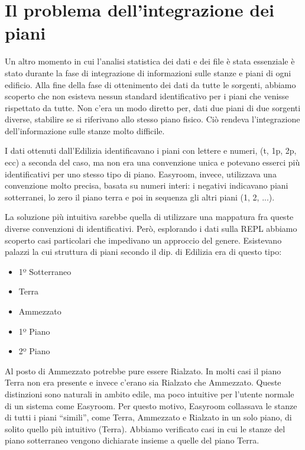 \documentclass[12pt]{report}
\begin{document}
\section{Il problema dell'integrazione dei piani}

Un altro momento in cui l'analisi statistica dei dati e dei file è
stata essenziale è stato durante la fase di integrazione di informazioni sulle
stanze e piani di ogni edificio. Alla fine della fase di ottenimento dei
dati da tutte le sorgenti, abbiamo scoperto che non esisteva nessun 
standard identificativo per i piani che venisse rispettato da tutte. 
Non c'era un modo diretto per, dati due piani di due sorgenti diverse,
stabilire se si riferivano allo stesso piano fisico. Ciò rendeva 
l'integrazione dell'informazione sulle stanze molto difficile.

I dati ottenuti dall'Edilizia identificavano i piani con lettere e numeri, 
(t, 1p, 2p, ecc) a seconda del caso, ma non era una convenzione unica 
e potevano esserci più identificativi per uno stesso tipo di piano. 
Easyroom, invece, utilizzava una convenzione molto precisa, 
basata su numeri interi: i negativi indicavano piani sotterranei,
lo zero il piano terra e poi in sequenza gli altri piani (1, 2, ...). 

La soluzione più intuitiva sarebbe quella di utilizzare una mappatura fra
queste diverse convenzioni di identificativi. Però, esplorando
i dati sulla REPL abbiamo scoperto casi particolari che impedivano un
approccio del genere. Esistevano palazzi la cui struttura di piani
secondo il dip. di Edilizia era di questo tipo:

\begin{itemize}
	\item 1º Sotterraneo
	\item Terra
	\item Ammezzato
	\item 1º Piano
	\item 2º Piano
\end{itemize}

Al posto di Ammezzato potrebbe pure essere Rialzato. In molti casi
il piano Terra non era presente e invece c'erano sia Rialzato che
Ammezzato. Queste distinzioni sono naturali in ambito edile, ma poco
intuitive per l'utente normale di un sistema come Easyroom. Per questo 
motivo, Easyroom collassava le stanze di tutti i piani ``simili'',
come Terra, Ammezzato e Rialzato in un solo piano, di solito quello
più intuitivo (Terra). Abbiamo verificato casi in cui le stanze del piano 
sotterraneo vengono dichiarate insieme a quelle del piano Terra.
\end{document}
